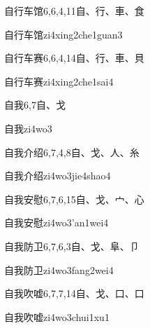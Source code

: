 \begin{entry}{自行车馆}{6,6,4,11}{⾃、⾏、⾞、⾷}
  \begin{phonetics}{自行车馆}{zi4xing2che1guan3}
  \end{phonetics}
\end{entry}

\begin{entry}{自行车赛}{6,6,4,14}{⾃、⾏、⾞、⾙}
  \begin{phonetics}{自行车赛}{zi4xing2che1sai4}
  \end{phonetics}
\end{entry}

\begin{entry}{自我}{6,7}{⾃、⼽}
  \begin{phonetics}{自我}{zi4wo3}
  \end{phonetics}
\end{entry}

\begin{entry}{自我介绍}{6,7,4,8}{⾃、⼽、⼈、⽷}
  \begin{phonetics}{自我介绍}{zi4wo3jie4shao4}
  \end{phonetics}
\end{entry}

\begin{entry}{自我安慰}{6,7,6,15}{⾃、⼽、⼧、⼼}
  \begin{phonetics}{自我安慰}{zi4wo3'an1wei4}
  \end{phonetics}
\end{entry}

\begin{entry}{自我防卫}{6,7,6,3}{⾃、⼽、⾩、⼙}
  \begin{phonetics}{自我防卫}{zi4wo3fang2wei4}
  \end{phonetics}
\end{entry}

\begin{entry}{自我吹嘘}{6,7,7,14}{⾃、⼽、⼝、⼝}
  \begin{phonetics}{自我吹嘘}{zi4wo3chui1xu1}
  \end{phonetics}
\end{entry}

